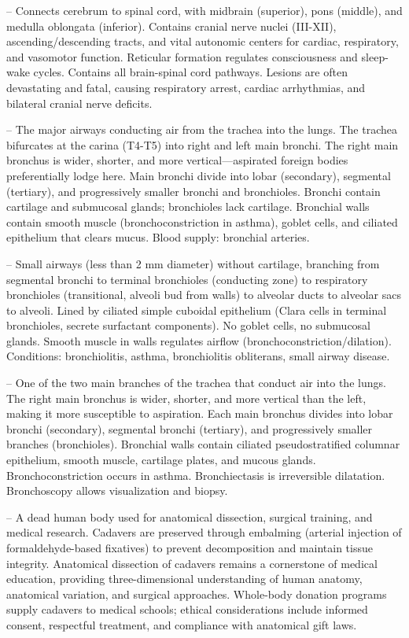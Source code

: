 -- Connects cerebrum to spinal cord, with midbrain (superior), pons (middle), and medulla oblongata (inferior). Contains cranial nerve nuclei (III-XII), ascending/descending tracts, and vital autonomic centers for cardiac, respiratory, and vasomotor function. Reticular formation regulates consciousness and sleep-wake cycles. Contains all brain-spinal cord pathways. Lesions are often devastating and fatal, causing respiratory arrest, cardiac arrhythmias, and bilateral cranial nerve deficits.

-- The major airways conducting air from the trachea into the lungs. The trachea bifurcates at the carina (T4-T5) into right and left main bronchi. The right main bronchus is wider, shorter, and more vertical—aspirated foreign bodies preferentially lodge here. Main bronchi divide into lobar (secondary), segmental (tertiary), and progressively smaller bronchi and bronchioles. Bronchi contain cartilage and submucosal glands; bronchioles lack cartilage. Bronchial walls contain smooth muscle (bronchoconstriction in asthma), goblet cells, and ciliated epithelium that clears mucus. Blood supply: bronchial arteries.

-- Small airways (less than 2 mm diameter) without cartilage, branching from segmental bronchi to terminal bronchioles (conducting zone) to respiratory bronchioles (transitional, alveoli bud from walls) to alveolar ducts to alveolar sacs to alveoli. Lined by ciliated simple cuboidal epithelium (Clara cells in terminal bronchioles, secrete surfactant components). No goblet cells, no submucosal glands. Smooth muscle in walls regulates airflow (bronchoconstriction/dilation). Conditions: bronchiolitis, asthma, bronchiolitis obliterans, small airway disease.

-- One of the two main branches of the trachea that conduct air into the lungs. The right main bronchus is wider, shorter, and more vertical than the left, making it more susceptible to aspiration. Each main bronchus divides into lobar bronchi (secondary), segmental bronchi (tertiary), and progressively smaller branches (bronchioles). Bronchial walls contain ciliated pseudostratified columnar epithelium, smooth muscle, cartilage plates, and mucous glands. Bronchoconstriction occurs in asthma. Bronchiectasis is irreversible dilatation. Bronchoscopy allows visualization and biopsy.

-- A dead human body used for anatomical dissection, surgical training, and medical research. Cadavers are preserved through embalming (arterial injection of formaldehyde-based fixatives) to prevent decomposition and maintain tissue integrity. Anatomical dissection of cadavers remains a cornerstone of medical education, providing three-dimensional understanding of human anatomy, anatomical variation, and surgical approaches. Whole-body donation programs supply cadavers to medical schools; ethical considerations include informed consent, respectful treatment, and compliance with anatomical gift laws.

